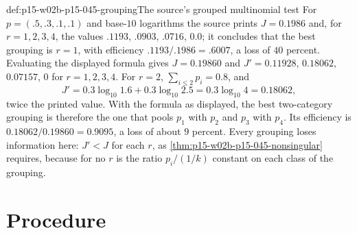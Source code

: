 \begin{hbexample}{def:p15-w02b-p15-045-grouping}{The source's grouped multinomial test}
For \(p=(.5,.3,.1,.1)\) and base-\(10\) logarithms the source prints
\(J=0.1986\) and, for \(r=1,2,3,4\), the values \(.1193\), \(.0903\),
\(.0716\), \(0.0\); it concludes that the best grouping is \(r=1\),
with efficiency \(.1193/.1986=.6007\), a loss of \(40\) percent.
Evaluating the displayed formula gives \(J=0.19860\) and
\(J'=0.11928\), \(0.18062\), \(0.07157\), \(0\) for \(r=1,2,3,4\).
For \(r=2\), \(\sum_{i\leq2}p_i=0.8\), and
\[
  J'=0.3\log_{10}1.6+0.3\log_{10}2.5=0.3\log_{10}4=0.18062,
\]
twice the printed value. With the formula as displayed, the best
two-category grouping is therefore the one that pools \(p_1\) with
\(p_2\) and \(p_3\) with \(p_4\). Its efficiency is
\(0.18062/0.19860=0.9095\), a loss of about \(9\) percent.
Every grouping loses information here: \(J'<J\) for each \(r\), as
\cref{thm:p15-w02b-p15-045-nonsingular} requires, because for no \(r\)
is the ratio \(p_i/(1/k)\) constant on each class of the grouping.
\end{hbexample}

\section{Procedure}
\label{sec:p15-w02b-p15-045-procedure}

